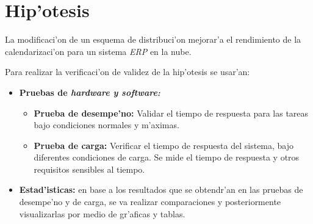 \newpage

\section*{Hip'otesis}

La modificaci'on de un esquema de distribuci'on mejorar'a el rendimiento de la calendarizaci'on para un sistema \textit{ERP} en la nube.

Para realizar la verificaci'on de validez de la hip'otesis se usar'an:


\begin{itemize}
	\item \textbf{Pruebas de \textit{hardware y software:}}
	\begin{itemize}
	\item \textbf{Prueba de desempe'no:} Validar el tiempo de respuesta para las tareas bajo condiciones normales y m'aximas.
	\item \textbf{Prueba de carga:} Verificar el tiempo de respuesta del sistema, bajo diferentes condiciones de carga. Se mide el tiempo de respuesta y otros requisitos sensibles al tiempo.
	\end{itemize}
	\item \textbf{Estad'isticas:} en base a los resultados que se obtendr'an en las pruebas de desempe'no y de carga, se va realizar comparaciones y posteriormente visualizarlas por medio de gr'aficas y tablas.
\end{itemize}
